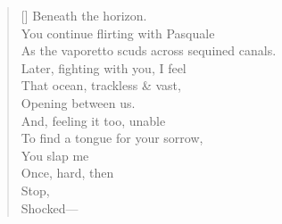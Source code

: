 \begin{verse}[\versewidth]
Beneath the horizon.\\
You continue flirting with Pasquale\\
As the vaporetto scuds across sequined canals.\\
Later, fighting with you, I feel\\
That ocean, trackless \& vast,\\
Opening between us.\\
And, feeling it too, unable\\
To find a tongue for your sorrow,\\
You slap me\\
Once, hard, then\\
Stop,\\
\hspace*{2\vgap} Shocked---
\end{verse}
